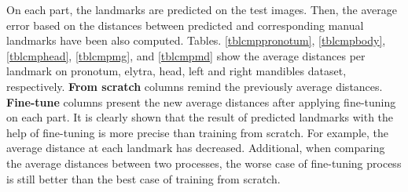 \documentclass[review]{elsarticle}
\begin{document}
On each part, the landmarks are predicted on the test images. Then, the average error based on the distances between predicted and corresponding manual landmarks have been also computed. Tables. \ref{tblcmppronotum}, \ref{tblcmpbody}, \ref{tblcmphead}, \ref{tblcmpmg}, and \ref{tblcmpmd} show the average distances per landmark on pronotum, elytra, head, left and right mandibles dataset, respectively. \textbf{From scratch} columns remind the previously average distances. \textbf{Fine-tune} columns present the new average distances after applying fine-tuning on each part. It is clearly shown that the result of predicted landmarks with the help of fine-tuning is more precise than training from scratch. For example, the average distance at each landmark has decreased. Additional, when comparing the average distances between two processes, the worse case of fine-tuning process is still better than the best case of training from scratch.
\end{document}
